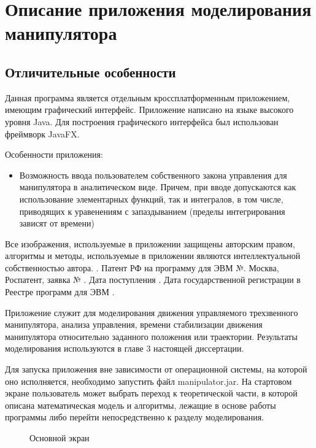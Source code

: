 \newpage
\appendix
\renewcommand{\thechapter}{\Asbuk{chapter}}
\chapter{Описание приложения моделирования манипулятора} 
\section{Отличительные особенности} \label{app1start}

Данная программа является отдельным кроссплатформенным приложением, имеющим графический интерфейс. Приложение написано на языке высокого уровня Java. Для построения графического интерфейса был использован фреймворк JavaFX.

Особенности приложения:
\begin{itemize}
\item{Возможность ввода пользователем собственного закона управления для манипулятора в аналитическом виде. Причем, при вводе допускаются как использование элементарных функций, так и интегралов, в том числе, приводящих к уравенениям с запаздыванием (пределы интегрирования зависят от времени)}
\end{itemize}

Все изображения, используемые в приложении защищены авторским правом, алгоритмы и методы, используемые в приложении являются интеллектуальной собственностью автора.  . Патент РФ на программу для ЭВМ №.  Москва, Роспатент, заявка № . Дата поступления .  Дата государственной регистрации в Реестре программ для ЭВМ . 

Приложение служит для моделирования движения управляемого трехзвенного манипулятора, анализа управления, времени стабилизации движения манипулятора относительно заданного положения или траектории. Результаты моделирования используются в главе 3 настоящей диссертации.

Для запуска приложения вне зависимости от операционной системы, на которой оно исполняется, необходимо запустить файл manipulator.jar. На стартовом экране пользователь может выбрать переход к теоретической части, в которой описана математическая модель и алгоритмы, лежащие в основе работы программы либо перейти непосредственно к разделу моделирования.

\begin{figure}[h]
\caption{Основной экран}
\label{ris:window}
\end{figure}

